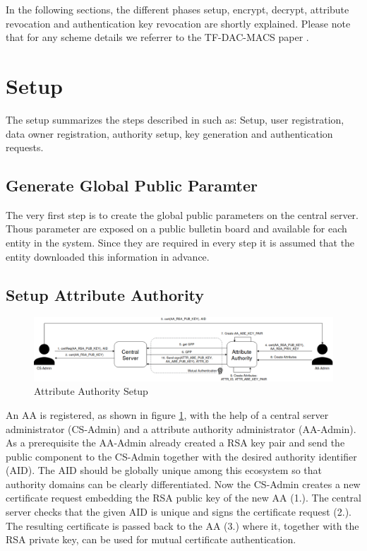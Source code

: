 In the following sections, the different phases setup, encrypt, decrypt, attribute revocation and authentication key revocation are shortly explained. Please note that for any scheme details we referrer to the TF-DAC-MACS \cite{li2017two} paper .

\section{Setup}
The setup summarizes the steps described in \cite{li2017two} such as: Setup, user registration, data owner registration, authority setup, key generation and authentication requests. 

\subsection{Generate Global Public Paramter}
The very first step is to create the global public parameters on the central server. Thous parameter are exposed on a public bulletin board and available for each entity in the system. Since they are required in every step it is assumed that the entity downloaded this information in advance. 

\subsection{Setup Attribute Authority}
\begin{figure}[!h]
\centering
    \includegraphics[width=\linewidth]{img/aa_setup.png}
    \caption{Attribute Authority Setup}
    \label{fig:aa-setup}
\end{figure}
An AA is registered, as shown in figure \ref{fig:aa-setup}, with the help of a central server administrator (CS-Admin) and a attribute authority administrator (AA-Admin). As a prerequisite the AA-Admin already created a RSA key pair and send the public component to the CS-Admin together with the desired authority identifier (AID). The AID should be globally unique among this ecosystem so that authority domains can be clearly differentiated. Now the CS-Admin creates a new certificate request embedding the RSA public key of the new AA (1.). The central server checks that the given AID is unique and signs the certificate request (2.). The resulting certificate is passed back to the AA (3.) where it, together with the RSA private key, can be used for mutual certificate authentication. 

